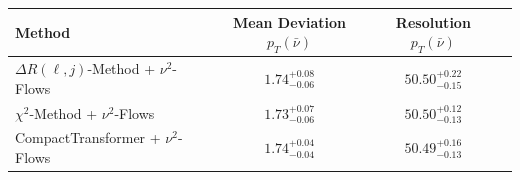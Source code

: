     \begin{tabular}{lccc}
        \toprule
        Method & Mean Deviation $p_{T}(\bar{\nu})$ & Resolution $p_{T}(\bar{\nu})$ \\
        \midrule
        $\Delta R(\ell,j)$-Method + $\nu^2$-Flows & $1.74^{+0.08}_{-0.06}$ & $50.50^{+0.22}_{-0.15}$ \\
        $\chi^2$-Method + $\nu^2$-Flows & $1.73^{+0.07}_{-0.06}$ & $50.50^{+0.12}_{-0.13}$ \\
        CompactTransformer + $\nu^2$-Flows & $1.74^{+0.04}_{-0.04}$ & $50.49^{+0.16}_{-0.13}$ \\
        \bottomrule
    \end{tabular}